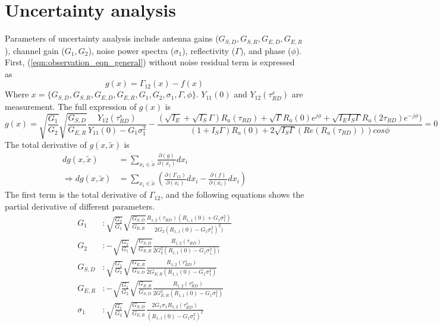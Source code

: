 \section{Uncertainty analysis}

Parameters of uncertainty analysis include antenna gains ($G_{S,D}, G_{S,R}, G_{E,D}, G_{E,R}$), channel gain ($G_1, G_2$), noise power spectra ($\sigma_1$), reflectivity ($\Gamma$), and phase ($\phi$).  First, (\ref{eqn:observation_eqn_general}) without noise residual  term is expressed as
\begin{equation}
g(x) = \Gamma_{12}(x) - f(x)
\end{equation}
Where $x=\{G_{S,D}, G_{S,R}, G_{E,D}, G_{E,R}, G_1, G_2, \sigma_1, \Gamma, \phi\}$. $Y_{11}(0)$  and $Y_{12}(\tau^s_{RD})$ are measurement. The full expression of $g(x)$ is
\begin{equation}
g(x) = \sqrt{\frac{G_1}{G_2}} \sqrt{\frac{G_{S,D}}{G_{E,R}}}  
\frac{Y_{12}(\tau^s_{RD})}{Y_{11}(0)-G_1 \sigma^2_1} -
 \frac
{(\sqrt{I_E}+ \sqrt{I_S} \Gamma)R_a(\tau_{RD})+
\sqrt{\Gamma}R_a(0)e^{j\phi}+
\sqrt{I_E I_S\Gamma}R_a(2\tau_{RD})e^{-j \phi } )
}
{(1+I_S \Gamma)R_a(0)+
2 \sqrt{I_S\Gamma}(Re(R_a(\tau_{RD})) )cos\phi
} =0                 
\label{Eq: uncertainty_g_gamma12_f}
\end{equation}
The total derivative of $g(x,\tilde{x})$ is
\begin{align}
dg(x,\tilde{x})&=\sum_{x_i \in \tilde{x}} \frac{\partial(g)}{\partial(x_i)} dx_i \\
\Rightarrow dg(x,\tilde{x})&=\sum_{x_i \in \tilde{x}} (\frac{\partial(\Gamma_{12})}{\partial(x_i)} dx_i - \frac{\partial(f)}{\partial(x_i)}dx_i)
\label{Eq: uncertainty_dg}
\end{align}
The first term is the total derivative of $\Gamma_{12}$, and the following equations shows the partial derivative of different parameters.
\begin{align}
G_1 &:
\sqrt{\frac{G_2}{G_1}}
\sqrt{\frac{G_{S,D}}{G_{E,R}}}
\frac{R_{1,2}(\tau_{RD}) (R_{1,1}(0) + G_1 \sigma_1^2)}
{2G_2(R_{1,1}(0) - G_1 \sigma_1^2)^2 )} \\
G_2 &:
-\sqrt{\frac{G_2}{G_1}}
\sqrt{\frac{G_{S,D}}{G_{E,R}}}
\frac{R_{1,2}(\tau_{RD})}
{2G_2^2(R_{1,1}(0) - G_1 \sigma_1^2) )} \\
G_{S,D} &:
 \sqrt{\frac{G_1}{G_2}}
 \sqrt{\frac{G_{E,R}}{G_{S,D}}}  
\frac{R_{1,2}(\tau^s_{RD})}{2 G_{E,R} (R_{1,1}(0)-G_1 \sigma^2_1)} \\
G_{E,R} &:
 -\sqrt{\frac{G_1}{G_2}}
 \sqrt{\frac{G_{E,R}}{G_{S,D}}}  
\frac{R_{1,2}(\tau^s_{RD})}{2 G_{E,R}^2 (R_{1,1}(0)-G_1 \sigma^2_1)} \\
\sigma_1 &:
\sqrt{\frac{G_1}{G_2}} \sqrt{\frac{G_{S,D}}{G_{E,R}}}  
\frac{2 G_1 \sigma_1 R_{1,2}(\tau^s_{RD})}{(R_{1,1}(0)-G_1 \sigma^2_1)^2} 
\end{align}
